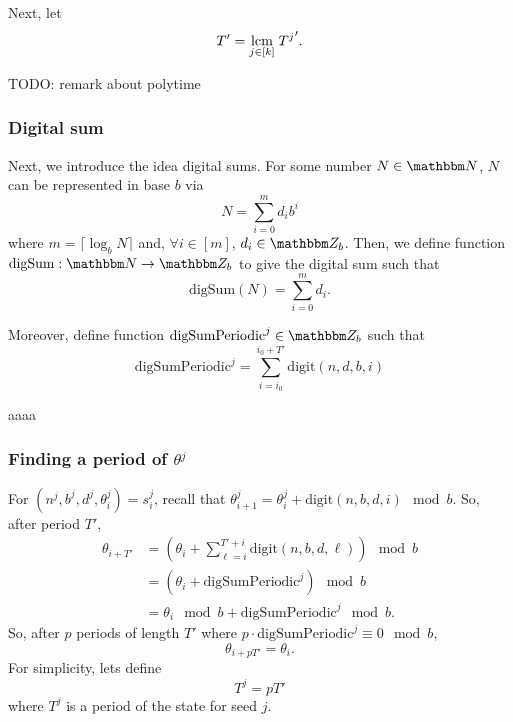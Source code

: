 \documentclass[11pt,titlepage]{article}
\newcommand{\rationalPeriod}{{T^j}'}
\newcommand{\rationalPeriodTotal}{{T}'}
\newcommand{\seedAngle}[1]{{\theta^j_{#1}}}
\newcommand{\seedAngleNotime}{{\theta}^j}
\newcommand{\digSumPeriodic}{\mathrm{digSumPeriodic}^j}
\begin{document}
Next, let $$
\rationalPeriodTotal = \lcm{j \in [k]}\; \rationalPeriod.
$$

\begin{remark}[Polytime]
  TODO: remark about polytime
\end{remark}

\subsubsection{Digital sum}
Next, we introduce the idea digital sums.
For some number $N \in \N$, $N$ can be represented in base $b$ via
\begin{equation}
  N = \sum_{i=0}^{m} d_i b^i
\end{equation}
where $m = \lceil \log_b N \rceil$ and, $\forall i \in [m]$, $d_i \in \Z_b$.
Then, we define function $\mathrm{digSum}: \N \rightarrow \Z_b$
to give the digital sum such that
\begin{equation}
  \mathrm{digSum}(N) = \sum_{i=0}^{m} d_i.
\end{equation}

Moreover, define function $\digSumPeriodic \in \Z_b$
such that
\begin{equation}
  \digSumPeriodic = \sum_{i = i_0}^{i_0 + \rationalPeriodTotal} \mathrm{digit}(n, d, b, i)
\end{equation}

\begin{remark}
  aaaa
\end{remark}

\subsubsection{Finding a period of $\seedAngleNotime$} %
For $(n^j, b^j, d^j, \theta_i^j) = s_i^j$,
recall that $\seedAngle{i + 1} = \seedAngle{i} + \mathrm{digit}(n, b, d, i) \mod b$.
So, after period $\rationalPeriodTotal$,
\begin{align*}
  \theta_{i + \rationalPeriodTotal} &= \left(\theta_{i} + \sum_{\ell = i}^{\rationalPeriodTotal + i} \mathrm{digit}(n, b, d, \ell)\right) \mod b\\
  &= \left(\theta_{i} +  \digSumPeriodic\right) \mod b\\
  &= \theta_{i} \mod b +  \digSumPeriodic \mod b.
\end{align*}
So, after $p$ periods of length $\rationalPeriodTotal$ where $p  \cdot \digSumPeriodic \equiv 0 \mod b$,
$$
\theta_{i + p\rationalPeriodTotal} = \theta_i.
$$
For simplicity, lets define
$$
  T^j = p\rationalPeriodTotal
$$
where $T^j$ is a period of the state for seed $j$.
\end{document}

